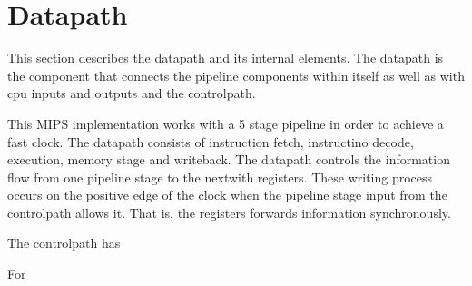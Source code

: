 \section{Datapath}
This section describes the datapath and its internal elements. The datapath is the component that connects the pipeline components within itself as well as with cpu inputs and outputs and the controlpath.

This MIPS implementation works with a 5 stage pipeline in order to achieve a fast clock. The datapath consists of instruction fetch, instructino decode, execution, memory stage and writeback.
The datapath controls the information flow from one pipeline stage to the nextwith registers. 
These writing process occurs 
on the positive edge of the clock when the pipeline stage input from the controlpath
allows it. That is, the registers forwards information synchronously. 

The controlpath has

For 